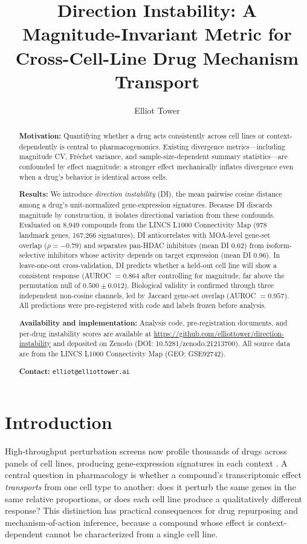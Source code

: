 \documentclass[11pt]{article}
\title{Direction Instability: A Magnitude-Invariant Metric for Cross-Cell-Line Drug Mechanism Transport}
\author{Elliot Tower}
\affil{Independent researcher \\ \texttt{elliot@elliottower.ai}}
\date{}
\begin{document}
\maketitle

\begin{abstract}
\textbf{Motivation:}
Quantifying whether a drug acts consistently across cell lines or
context-dependently is central to pharmacogenomics.  Existing divergence
metrics---including magnitude CV, Fr\'echet variance, and
sample-size-dependent summary statistics---are confounded by effect
magnitude: a stronger effect mechanically inflates divergence even when a
drug's behavior is identical across cells.

\textbf{Results:}
We introduce \emph{direction instability} (DI), the mean pairwise cosine
distance among a drug's unit-normalized gene-expression signatures.
Because DI discards magnitude by construction, it isolates directional
variation from these confounds.  Evaluated on 8{,}949 compounds from the
LINCS L1000 Connectivity Map (978 landmark genes, 167{,}266 signatures),
DI anticorrelates with MOA-level gene-set overlap ($\rho = -0.79$) and
separates pan-HDAC inhibitors (mean DI 0.62) from isoform-selective
inhibitors whose activity depends on target expression (mean DI 0.96).
In leave-one-out cross-validation, DI predicts whether a held-out cell
line will show a consistent response (AUROC $= 0.864$ after controlling
for magnitude, far above the permutation null of $0.500 \pm 0.012$).  Biological validity
is confirmed through three independent non-cosine channels, led by
Jaccard gene-set overlap (AUROC $= 0.957$).  All predictions were
pre-registered with code and labels frozen before analysis.

\textbf{Availability and implementation:}
Analysis code, pre-registration documents, and per-drug instability
scores are available at
\url{https://github.com/elliottower/direction-instability}
and deposited on Zenodo (DOI: 10.5281/zenodo.21213700).
All source data are from the LINCS L1000 Connectivity Map (GEO: GSE92742).

\textbf{Contact:} \texttt{elliot@elliottower.ai}
\end{abstract}

\section{Introduction}

High-throughput perturbation screens now profile thousands of drugs
across panels of cell lines, producing gene-expression signatures in
each context \citep{subramanian2017next,lamb2006connectivity}.  A central
question in pharmacology is whether a compound's transcriptomic effect
\emph{transports} from one cell type to another: does it perturb the
same genes in the same relative proportions, or does each cell line
produce a qualitatively different response?  This distinction has
practical consequences for drug repurposing and mechanism-of-action
inference, because a compound whose effect is context-dependent cannot
be characterized from a single cell line.
\end{document}
